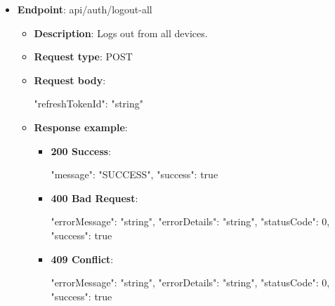 \begin{itemize}
    \item \textbf{Endpoint}: api/auth/logout-all
    \begin{itemize}
        \item \textbf{Description}: Logs out from all devices.
        \item \textbf{Request type}: POST
        \item \textbf{Request body}:
        \begin{spverbatim}
        {
            "refreshTokenId": "string"
        }
        \end{spverbatim}
        \item  \textbf{Response example}:
        \begin{itemize}
            \item \textbf{200 Success}:
            \begin{spverbatim}
            {
                "message": "SUCCESS",
                "success": true
            }
            \end{spverbatim}
            \item \textbf{400 Bad Request}:
            \begin{spverbatim}
            {
                "errorMessage": "string",
                "errorDetails": "string",
                "statusCode": 0,
                "success": true
            }
            \end{spverbatim}
            \item \textbf{409 Conflict}:
            \begin{spverbatim}
            {
                "errorMessage": "string",
                "errorDetails": "string",
                "statusCode": 0,
                "success": true
            }
            \end{spverbatim}
        \end{itemize}
    \end{itemize}

\end{itemize}